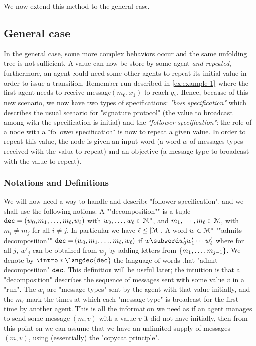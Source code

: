 We now extend this method to the general case. 


\subsection{General case}
In the general case, some more complex behaviors occur and the same unfolding tree is not sufficient. A value can now be store by some agent \emph{and repeated}, furthermore, an agent could need some other agents to repeat its initial value in order to issue a transition. Remember run described in \cref{ex:example-1}~where the first agent needs to receive message$(m_6, x_1)$ to reach $q_7$. Hence, because of this new scenario, we now have two types of specifications: \emph{"boss specification"} which describes the usual scenario for "signature protocol" (the value to broadcast among with the specification is initial) and the \emph{"follower specification"}: the role of a node with a "follower specification" is now to repeat a given value. In order to repeat this value, the node is given an input word (a word $w$ of messages types received with the value to repeat) and an objective (a message type to broadcast with the value to repeat).

\subsubsection{Notations and Definitions}
\label{sec:decidability-defs}

We will now need a way to handle and describe "follower specification", and we shall use the following notions.
A ""decomposition"" is a tuple $\mathtt{dec} = (w_0, m_1, \ldots, m_\ell, w_\ell)$ with $w_0, \ldots, w_\ell \in \mathcal{M}^*$, and $m_1, \cdots, m_\ell \in \mathcal{M}$, with $m_i \neq m_j$ for all $i\neq j$. In particular we have $\ell \leq |\mathcal{M}|$. 
A word $w \in \mathcal{M}^*$ ""admits decomposition"" $\mathtt{dec} = (w_0, m_1, \ldots, m_\ell, w_\ell)$ if $w \subword w'_0 w'_1 \cdots w'_\ell$ where for all $j$, $w'_j$ can be obtained from $w_j$ by adding letters from $\{m_1, \ldots, m_{j-1}\}$. 
We denote by $\intro*\langdec{\decsymb}$ the language of words that "admit decomposition" $\mathtt{dec}$. 
This definition will be useful later; the intuition is that a "decomposition" describes the sequence of messages sent with some value $v$ in a "run". The $w_i$ are "message types" sent by the agent with that value initially, and the $m_i$ mark the times at which each "message type" is broadcast for the first time by another agent. This is all the information we need as if an agent manages to send some message $(m,v)$ with a value $v$ it did not have initially, then from this point on we can assume that we have an unlimited supply of messages $(m,v)$, using (essentially) the "copycat principle".  

